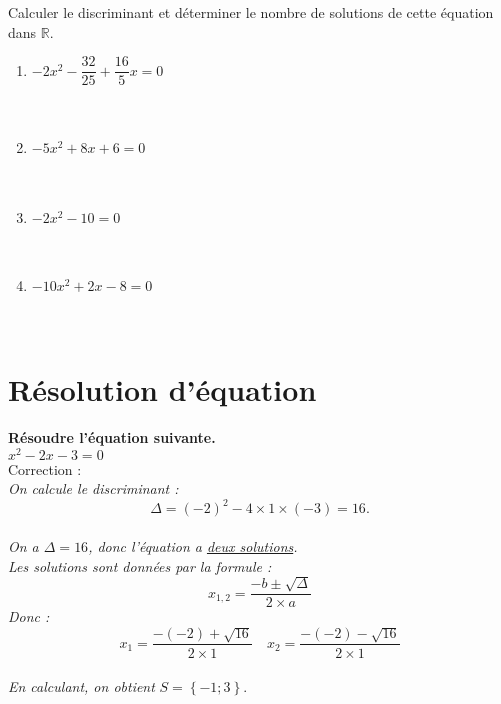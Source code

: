 \documentclass[11pt]{article}
\begin{document}
\begin{exercice}
Calculer le discriminant et déterminer le nombre de solutions de cette
équation dans $\mathbb{R}$.
\begin{multicols}{2}
  \begin{enumerate}
  \item $-2x^2-\dfrac{32}{25}+\dfrac{16}{5}x=0$ \\ \dtf \\ \dtf \\ \dtf 
  \item $-5x^2+8x+6=0$ \\ \dtf \\ \dtf \\ \dtf 
  \item $-2x^2-10=0$ \\ \dtf \\ \dtf \\ \dtf 
  \item $-10x^2+2x-8=0$ \\ \dtf \\ \dtf \\ \dtf 
  \end{enumerate}
\end{multicols}
\end{exercice}

\newpage

\section{Résolution d'équation}

\begin{exercice}
\textbf{Résoudre l'équation suivante.}\\
 $x^2-2x-3=0$ \\
Correction :\\
\textit{On calcule le discriminant :} \\
\[\Delta=\left(-2\right)^2-4\times1\times\left(-3\right)=16.\] \\
\textit{On a $\Delta=16$, donc l'équation a \underline{deux solutions}. \\
Les solutions sont données par la formule :
}\[x_{1,2}=\dfrac{-b \pm \sqrt{\Delta}}{2\times a}\]
\textit{Donc :}
\[x_{1}=\dfrac{-\left(-2\right)+\sqrt{16}}{2\times1} \quad
x_{2}=\dfrac{-\left(-2\right)-\sqrt{16}}{2\times1}\]\\
\textit{En calculant, on obtient} ${S = \left\{-1;3\right\}}$.
\end{exercice}
\end{document}
